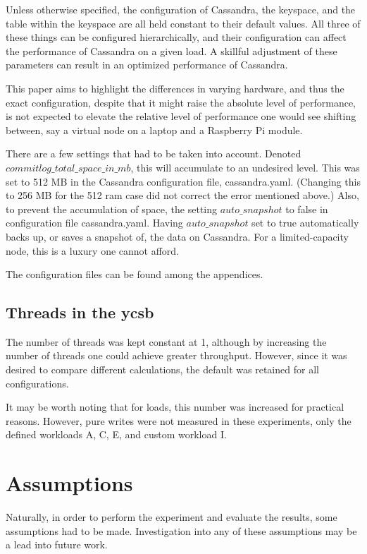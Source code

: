 Unless otherwise specified, the configuration of Cassandra, the keyspace, and the table within the keyspace are all held constant to their default values.  All three of these things can be configured hierarchically, and their configuration can affect the performance of Cassandra on a given load.  A skillful adjustment of these parameters can result in an optimized performance of Cassandra.

This paper aims to highlight the differences in varying hardware, and thus the exact configuration, despite that it might raise the absolute level of performance, is not expected to elevate the relative level of performance one would see shifting between, say a virtual node on a laptop and a Raspberry Pi module.

There are a few settings that had to be taken into account.  Denoted $commitlog\_total\_space\_in\_mb$, this will accumulate to an undesired level.  This was set to 512 MB in the Cassandra configuration file, cassandra.yaml.  (Changing this to 256 MB for the 512 \gls{ram} case did not correct the error mentioned above.)  Also, to prevent the accumulation of space, the setting $auto\_snapshot$ to false in configuration file cassandra.yaml.  Having $auto\_snapshot$ set to true automatically backs up, or saves a snapshot of, the data on Cassandra.  For a limited-capacity node, this is a luxury one cannot afford.

The configuration files can be found among the appendices.

\subsection{Threads in the \gls{ycsb}}

The number of threads was kept constant at 1, although by increasing the number of threads one could achieve greater throughput.  However, since it was desired to compare different calculations, the default was retained for all configurations.

It may be worth noting that for loads, this number was increased for practical reasons.  However, pure writes were not measured in these experiments, only the defined workloads A, C, E, and custom workload I.

\section{Assumptions}
\label{Assumptions}

Naturally, in order to perform the experiment and evaluate the results, some assumptions had to be made.
Investigation into any of these assumptions may be a lead into future work.

